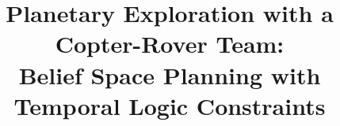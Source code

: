 \documentclass[conference]{IEEEtran}
\begin{document}

\title{\huge Planetary Exploration with a Copter-Rover Team:\\
Belief Space Planning with Temporal Logic Constraints}






% 

\maketitle
\end{document}
